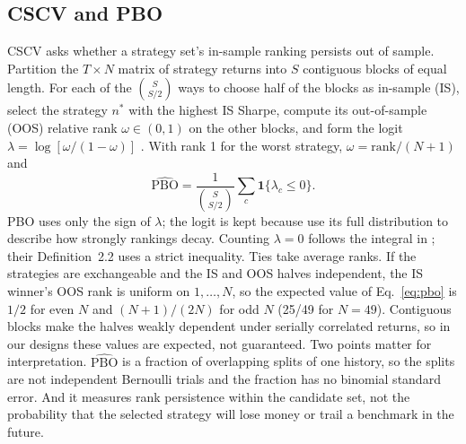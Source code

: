 \documentclass[11pt,a4paper]{article}
\begin{document}
\subsection{CSCV and PBO}
CSCV asks whether a strategy set's in-sample ranking persists out of sample. Partition the $T\times N$ matrix of strategy returns into $S$ contiguous blocks of equal length. For each of the $\binom{S}{S/2}$ ways to choose half of the blocks as in-sample (IS), select the strategy $n^\ast$ with the highest IS Sharpe, compute its out-of-sample (OOS) relative rank $\omega\in(0,1)$ on the other blocks, and form the logit $\lambda=\log[\omega/(1-\omega)]$ \citep[Algorithm~2.3, pp.~11--12]{bailey2017pbo}. With rank 1 for the worst strategy, $\omega=\mathrm{rank}/(N+1)$ and
\begin{equation}\label{eq:pbo}
\widehat{\mathrm{PBO}}=\frac{1}{\binom{S}{S/2}}\sum_{c}\mathbf 1\{\lambda_c\le0\}.
\end{equation}
PBO uses only the sign of $\lambda$; the logit is kept because \citet{bailey2017pbo} use its full distribution to describe how strongly rankings decay. Counting $\lambda=0$ follows the integral in \citet[Sec.~3.1, p.~13]{bailey2017pbo}; their Definition~2.2 uses a strict inequality. Ties take average ranks. If the strategies are exchangeable and the IS and OOS halves independent, the IS winner's OOS rank is uniform on $1,\dots,N$, so the expected value of Eq.~\eqref{eq:pbo} is $1/2$ for even $N$ and $(N+1)/(2N)$ for odd $N$ (25/49 for $N=49$). Contiguous blocks make the halves weakly dependent under serially correlated returns, so in our designs these values are expected, not guaranteed. Two points matter for interpretation. $\widehat{\mathrm{PBO}}$ is a fraction of overlapping splits of one history, so the splits are not independent Bernoulli trials and the fraction has no binomial standard error. And it measures rank persistence within the candidate set, not the probability that the selected strategy will lose money or trail a benchmark in the future.
\end{document}
